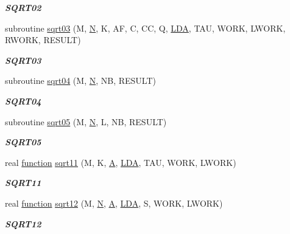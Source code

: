 \begin{DoxyCompactItemize}
\begin{DoxyCompactList}\small\item\em {\bfseries S\+Q\+R\+T02} \end{DoxyCompactList}\item 
subroutine \hyperlink{group__single__lin_gaeae21f84be0e1068baf76cf10be146c2}{sqrt03} (M, \hyperlink{polmisc_8c_a0240ac851181b84ac374872dc5434ee4}{N}, K, A\+F, C, C\+C, Q, \hyperlink{example__user_8c_ae946da542ce0db94dced19b2ecefd1aa}{L\+D\+A}, T\+A\+U, W\+O\+R\+K, L\+W\+O\+R\+K, R\+W\+O\+R\+K, R\+E\+S\+U\+L\+T)
\begin{DoxyCompactList}\small\item\em {\bfseries S\+Q\+R\+T03} \end{DoxyCompactList}\item 
subroutine \hyperlink{group__single__lin_gaa20cb2db08122acf44ad5732dd40d128}{sqrt04} (M, \hyperlink{polmisc_8c_a0240ac851181b84ac374872dc5434ee4}{N}, N\+B, R\+E\+S\+U\+L\+T)
\begin{DoxyCompactList}\small\item\em {\bfseries S\+Q\+R\+T04} \end{DoxyCompactList}\item 
subroutine \hyperlink{group__single__lin_gafa5bdb34d3d7382c7a17d5977aef8aca}{sqrt05} (M, \hyperlink{polmisc_8c_a0240ac851181b84ac374872dc5434ee4}{N}, L, N\+B, R\+E\+S\+U\+L\+T)
\begin{DoxyCompactList}\small\item\em {\bfseries S\+Q\+R\+T05} \end{DoxyCompactList}\item 
real \hyperlink{afunc_8m_a7b5e596df91eadea6c537c0825e894a7}{function} \hyperlink{group__single__lin_gafb9ec2d6bba0950d67553d0634567a42}{sqrt11} (M, K, \hyperlink{classA}{A}, \hyperlink{example__user_8c_ae946da542ce0db94dced19b2ecefd1aa}{L\+D\+A}, T\+A\+U, W\+O\+R\+K, L\+W\+O\+R\+K)
\begin{DoxyCompactList}\small\item\em {\bfseries S\+Q\+R\+T11} \end{DoxyCompactList}\item 
real \hyperlink{afunc_8m_a7b5e596df91eadea6c537c0825e894a7}{function} \hyperlink{group__single__lin_gaea6ca6681fe1402ff5b7f8eecd6b8ff2}{sqrt12} (M, \hyperlink{polmisc_8c_a0240ac851181b84ac374872dc5434ee4}{N}, \hyperlink{classA}{A}, \hyperlink{example__user_8c_ae946da542ce0db94dced19b2ecefd1aa}{L\+D\+A}, S, W\+O\+R\+K, L\+W\+O\+R\+K)
\begin{DoxyCompactList}\small\item\em {\bfseries S\+Q\+R\+T12} \end{DoxyCompactList}\item 

\end{DoxyCompactItemize}
